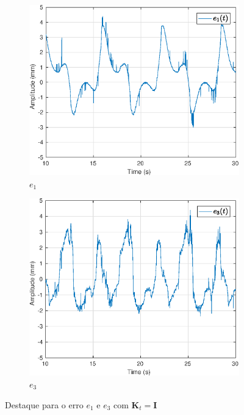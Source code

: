 \begin{figure}[H]
\centering
\begin{subfigure}{.5\textwidth}
  \centering
  \includegraphics[width=\linewidth]{./img/traj_2_k1/error0.eps}
  \caption{$e_1$}
  \label{fig:sub1}
\end{subfigure}%
\begin{subfigure}{.5\textwidth}
  \centering
  \includegraphics[width=\linewidth]{./img/traj_2_k1/error2.eps}
  \caption{$e_3$}
  \label{fig:sub2}
\end{subfigure}
\caption{Destaque para o erro $e_1$ e $e_3$ com $\bm{K}_t = \bm{I}$}
\label{fig:erro_traj}
\end{figure}

